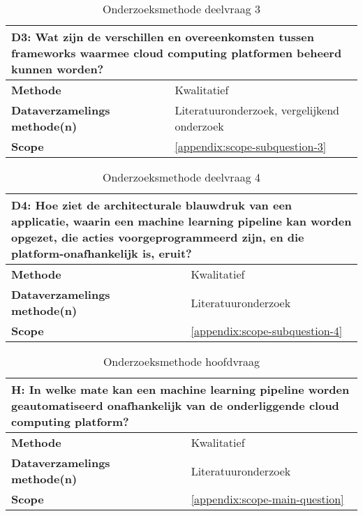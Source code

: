 \begin{table}[hbt!]
  \centering
  \begin{tabular}{|p{.215\linewidth}|p{.72\linewidth}|}
  \hline
  \multicolumn{2}{|p{.97\linewidth}|}{\textbf{D3: Wat zijn de verschillen en overeenkomsten tussen frameworks waarmee cloud computing platformen beheerd kunnen worden?}} \\ \hline
    \textbf{Methode}&
      Kwalitatief
    \\ \hline
    \textbf{Dataverzamelings methode(n)}&
      Literatuuronderzoek, vergelijkend onderzoek
    \\ \hline
    \textbf{Scope}&
      \autoref{appendix:scope-subquestion-3}
    \\ \hline
  \end{tabular}
  \caption{Onderzoeksmethode deelvraag 3}
  \label{table:sq3}
\end{table}

\space
\newpage

\begin{table}[hbt!]
  \centering
  \begin{tabular}{|p{.215\linewidth}|p{.72\linewidth}|}
  \hline
  \multicolumn{2}{|p{.97\linewidth}|}{\textbf{D4: Hoe ziet de architecturale blauwdruk van een applicatie, waarin een machine learning pipeline kan worden opgezet, die acties voorgeprogrammeerd zijn, en die platform-onafhankelijk is, eruit?}} \\ \hline
    \textbf{Methode}&
      Kwalitatief
    \\ \hline
    \textbf{Dataverzamelings methode(n)}&
      Literatuuronderzoek
    \\ \hline
    \textbf{Scope}&
      \autoref{appendix:scope-subquestion-4}
    \\ \hline
  \end{tabular}
  \caption{Onderzoeksmethode deelvraag 4}
  \label{table:sq4}
\end{table}

\begin{table}[hbt!]
  \centering
  \begin{tabular}{|p{.215\linewidth}|p{.72\linewidth}|}
  \hline
  \multicolumn{2}{|p{.97\linewidth}|}{\textbf{H: In welke mate kan een machine learning pipeline worden geautomatiseerd onafhankelijk van de onderliggende cloud computing platform?}} \\ \hline
    \textbf{Methode}&
      Kwalitatief
    \\ \hline
    \textbf{Dataverzamelings methode(n)}&
      Literatuuronderzoek
    \\ \hline
    \textbf{Scope}&
      \autoref{appendix:scope-main-question}
    \\ \hline
  \end{tabular}
  \caption{Onderzoeksmethode hoofdvraag}
  \label{table:mq}
\end{table}